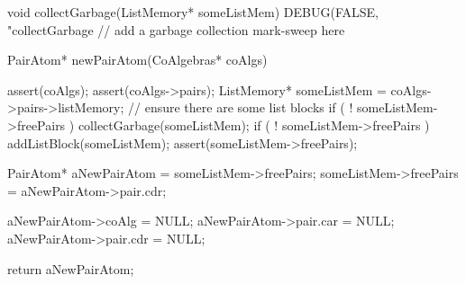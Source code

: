 void collectGarbage(ListMemory* someListMem) {
  DEBUG(FALSE, "collectGarbage %
  // add a garbage collection mark-sweep here
}

PairAtom* newPairAtom(CoAlgebras* coAlgs) {
  assert(coAlgs);
  assert(coAlgs->pairs);
  ListMemory* someListMem = coAlgs->pairs->listMemory;
  // ensure there are some list blocks
  if ( ! someListMem->freePairs ) collectGarbage(someListMem);
  if ( ! someListMem->freePairs ) addListBlock(someListMem);
  assert(someListMem->freePairs);

  PairAtom* aNewPairAtom = someListMem->freePairs;
  someListMem->freePairs = aNewPairAtom->pair.cdr;

  aNewPairAtom->coAlg    = NULL;
  aNewPairAtom->pair.car = NULL;
  aNewPairAtom->pair.cdr = NULL;

  return aNewPairAtom;
}
\stopCCode
